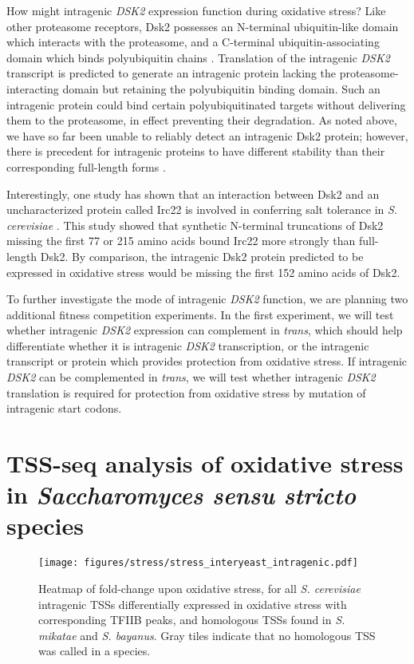 How might intragenic \textit{DSK2} expression function during oxidative stress?
Like other proteasome receptors, Dsk2 possesses an N-terminal ubiquitin-like domain which interacts with the proteasome, and a C-terminal ubiquitin-associating domain which binds polyubiquitin chains \citep{funakoshi2002}.
Translation of the intragenic \textit{DSK2} transcript is predicted to generate an intragenic protein lacking the proteasome-interacting domain but retaining the polyubiquitin binding domain.
Such an intragenic protein could bind certain polyubiquitinated targets without delivering them to the proteasome, in effect preventing their degradation.
As noted above, we have so far been unable to reliably detect an intragenic Dsk2 protein; however, there is precedent for intragenic proteins to have different stability than their corresponding full-length forms \citep{gammie1999, benanti2009}.

Interestingly, one study has shown that an interaction between Dsk2 and an uncharacterized protein called Irc22 is involved in conferring salt tolerance in \textit{S. cerevisiae} \citep{ishii2014}.
This study showed that synthetic N-terminal truncations of Dsk2 missing the first 77 or 215 amino acids bound Irc22 more strongly than full-length Dsk2.
By comparison, the intragenic Dsk2 protein predicted to be expressed in oxidative stress would be missing the first 152 amino acids of Dsk2.

To further investigate the mode of intragenic \textit{DSK2} function, we are planning two additional fitness competition experiments.
In the first experiment, we will test whether intragenic \textit{DSK2} expression can complement in \textit{trans}, which should help differentiate whether it is intragenic \textit{DSK2} transcription, or the intragenic transcript or protein which provides protection from oxidative stress.
If intragenic \textit{DSK2} can be complemented in \textit{trans}, we will test whether intragenic \textit{DSK2} translation is required for protection from oxidative stress by mutation of intragenic start codons.

\section[TSS-seq analysis of oxidative stress\\ in \textit{Saccharomyces sensu stricto} species]{TSS-seq analysis of oxidative stress in \textit{Saccharomyces sensu stricto} species}

\begin{figure}[h]
    \texttt{[image: figures/stress/stress\_interyeast\_intragenic.pdf]}
    \caption[Heatmap of fold-change upon oxidative stress, for \textit{S. cerevisiae} intragenic TSSs differentially expressed in oxidative stress, and homologous TSSs found in \textit{S. mikatae} and \textit{S. bayanus}.]{Heatmap of fold-change upon oxidative stress, for all \textit{S. cerevisiae} intragenic TSSs differentially expressed in oxidative stress with corresponding TFIIB peaks, and homologous TSSs found in \textit{S. mikatae} and \textit{S. bayanus}. Gray tiles indicate that no homologous TSS was called in a species.}
    \label{fig:stress_interyeast_intragenic}
\end{figure}

